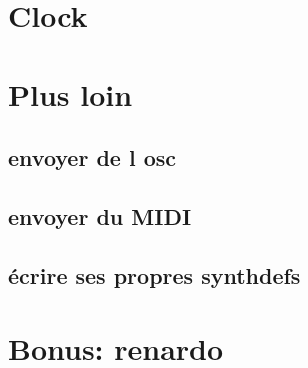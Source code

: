 \section{Clock}

\section{Plus loin}
\subsection{envoyer de l osc}
\subsection{envoyer du MIDI}
\subsection{écrire ses propres synthdefs}

\section{Bonus: renardo}

